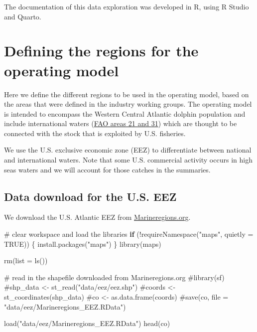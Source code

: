 \documentclass[
  letterpaper,
  oneside,
  open=any]{scrbook}
\newenvironment{Shaded}{\begin{snugshade}}{\end{snugshade}}
\newcommand{\AttributeTok}[1]{\textcolor[rgb]{0.40,0.45,0.13}{#1}}
\newcommand{\CommentTok}[1]{\textcolor[rgb]{0.37,0.37,0.37}{#1}}
\newcommand{\ConstantTok}[1]{\textcolor[rgb]{0.56,0.35,0.01}{#1}}
\newcommand{\ControlFlowTok}[1]{\textcolor[rgb]{0.00,0.23,0.31}{\textbf{#1}}}
\newcommand{\FunctionTok}[1]{\textcolor[rgb]{0.28,0.35,0.67}{#1}}
\newcommand{\NormalTok}[1]{\textcolor[rgb]{0.00,0.23,0.31}{#1}}
\newcommand{\SpecialCharTok}[1]{\textcolor[rgb]{0.37,0.37,0.37}{#1}}
\newcommand{\StringTok}[1]{\textcolor[rgb]{0.13,0.47,0.30}{#1}}
\begin{document}
The documentation of this data exploration was developed in R, using R
Studio and Quarto.


\chapter{Defining the regions for the operating
model}\label{defining-the-regions-for-the-operating-model}

Here we define the different regions to be used in the operating model,
based on the areas that were defined in the industry working groups. The
operating model is intended to encompass the Western Central Atlantic
dolphin population and include international waters
(\href{https://www.fao.org/fishery/en/area/search}{FAO areas 21 and 31})
which are thought to be connected with the stock that is exploited by
U.S. fisheries.

We use the U.S. exclusive economic zone (EEZ) to differentiate between
national and international waters. Note that some U.S. commercial
activity occurs in high seas waters and we will account for those
catches in the summaries.

\section{Data download for the U.S.
EEZ}\label{data-download-for-the-u.s.-eez}

We download the U.S. Atlantic EEZ from
\href{https://www.marineregions.org/gazetteer.php?p=details&id=8456}{Marineregions.org}.

\begin{Shaded}
\begin{Highlighting}[]
\CommentTok{\# clear workspace and load the libraries}
\ControlFlowTok{if}\NormalTok{ (}\SpecialCharTok{!}\FunctionTok{requireNamespace}\NormalTok{(}\StringTok{"maps"}\NormalTok{, }\AttributeTok{quietly =} \ConstantTok{TRUE}\NormalTok{)) \{}
  \FunctionTok{install.packages}\NormalTok{(}\StringTok{"maps"}\NormalTok{) \}}
\FunctionTok{library}\NormalTok{(maps)}

\FunctionTok{rm}\NormalTok{(}\AttributeTok{list =} \FunctionTok{ls}\NormalTok{())}

\CommentTok{\# read in the shapefile downloaded from Marineregions.org}
\CommentTok{\#library(sf)}
\CommentTok{\#shp\_data \textless{}{-} st\_read("data/eez/eez.shp")}
\CommentTok{\#coords \textless{}{-} st\_coordinates(shp\_data)}
\CommentTok{\#co \textless{}{-} as.data.frame(coords)}
\CommentTok{\#save(co, file = "data/eez/Marineregions\_EEZ.RData")}

\FunctionTok{load}\NormalTok{(}\StringTok{"data/eez/Marineregions\_EEZ.RData"}\NormalTok{)}
\FunctionTok{head}\NormalTok{(co)}
\end{Highlighting}
\end{Shaded}
\end{document}
